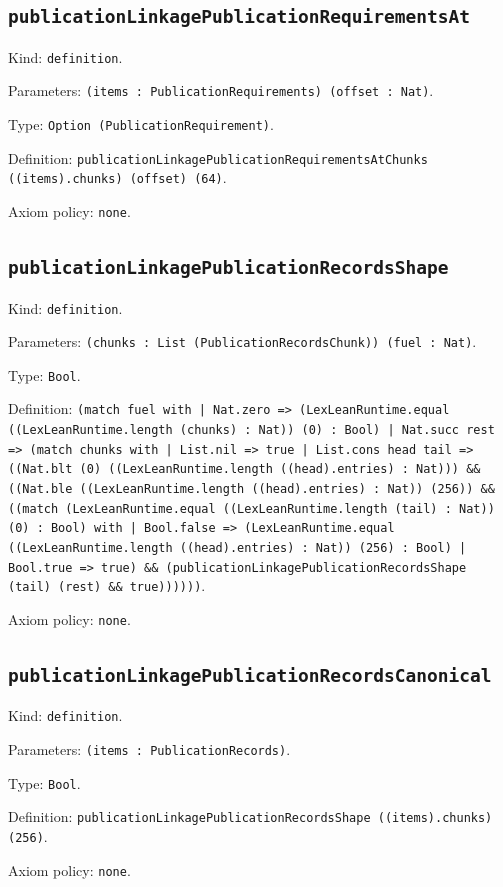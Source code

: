 \documentclass[11pt]{article}
\begin{document}
\subsection*{\texttt{publicationLinkagePublicationRequirementsAt}}
\noindent Kind: \texttt{definition}.\par
\noindent Parameters: \texttt{(items : PublicationRequirements) (offset : Nat)}.\par
\noindent Type: \texttt{Option (PublicationRequirement)}.\par
\noindent Definition: \texttt{publicationLinkagePublicationRequirementsAtChunks ((items).chunks) (offset) (64)}.\par
\noindent Axiom policy: \texttt{none}.\par
\subsection*{\texttt{publicationLinkagePublicationRecordsShape}}
\noindent Kind: \texttt{definition}.\par
\noindent Parameters: \texttt{(chunks : List (PublicationRecordsChunk)) (fuel : Nat)}.\par
\noindent Type: \texttt{Bool}.\par
\noindent Definition: \texttt{(match fuel with | Nat.zero => (LexLeanRuntime.equal ((LexLeanRuntime.length (chunks) : Nat)) (0) : Bool) | Nat.succ rest => (match chunks with | List.nil => true | List.cons head tail => ((Nat.blt (0) ((LexLeanRuntime.length ((head).entries) : Nat))) \&\& ((Nat.ble ((LexLeanRuntime.length ((head).entries) : Nat)) (256)) \&\& ((match (LexLeanRuntime.equal ((LexLeanRuntime.length (tail) : Nat)) (0) : Bool) with | Bool.false => (LexLeanRuntime.equal ((LexLeanRuntime.length ((head).entries) : Nat)) (256) : Bool) | Bool.true => true) \&\& (publicationLinkagePublicationRecordsShape (tail) (rest) \&\& true))))))}.\par
\noindent Axiom policy: \texttt{none}.\par
\subsection*{\texttt{publicationLinkagePublicationRecordsCanonical}}
\noindent Kind: \texttt{definition}.\par
\noindent Parameters: \texttt{(items : PublicationRecords)}.\par
\noindent Type: \texttt{Bool}.\par
\noindent Definition: \texttt{publicationLinkagePublicationRecordsShape ((items).chunks) (256)}.\par
\noindent Axiom policy: \texttt{none}.\par
\end{document}
